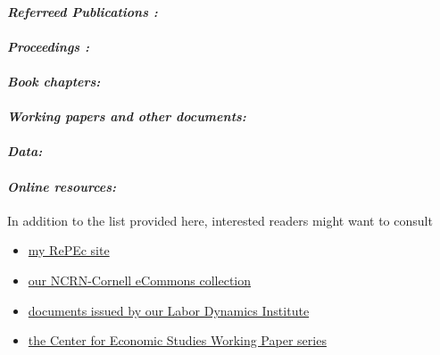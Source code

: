 \documentclass[10pt,letterpaper]{report}
\begin{document}
\paragraph{\it \bf Referreed Publications :}%
\printbibliography[type=article,heading=none]
\paragraph{\it \bf Proceedings :}%
\printbibliography[filter=collective,heading=none]
\paragraph{\it \bf Book chapters:}%
\printbibliography[type=inbook,heading=none]
\paragraph{\it \bf Working papers and other documents:}%
\printbibliography[type=report,heading=none]
\paragraph{\it \bf Data:}%
\printbibliography[type=dataset,heading=none]
\paragraph{\it \bf Online resources:}%
\printbibliography[type=online,heading=none]

In addition to the list provided here, interested readers might want to consult
\begin{itemize}
\item \href{http://ideas.repec.org/e/pvi26.html}{my RePEc site}
\item \href{http://ecommons.library.cornell.edu/handle/1813/30503}{our NCRN-Cornell 
eCommons collection}
\item \href{http://www.ilr.cornell.edu/LDI/documents/index.html}{documents issued by our 
Labor Dynamics Institute}
\item \href{http://ideas.repec.org/s/cen/wpaper.html}{the Center for Economic Studies Working 
Paper series}
\end{itemize}
\end{document}
